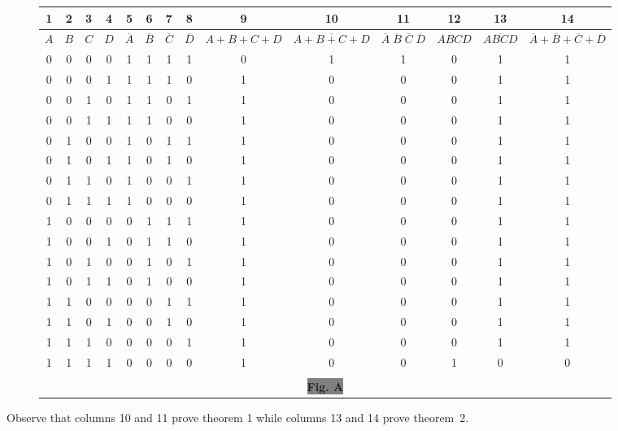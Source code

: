 \begin{solution}
\begin{figure}[H]
\begin{turn}{90}
\bigskip
\centering
\tabcolsep=6.5pt
\renewcommand{\arraystretch}{1.5}
\begin{tabular}{|c|c|c|c|c|c|c|c|c|c|c|c|c|c|}
\hline
{\bf 1} & {\bf 2} & {\bf 3} & {\bf 4} & {\bf 5} & {\bf 6} & {\bf 7} & {\bf 8} & {\bf 9} & {\bf 10} & {\bf 11} & {\bf 12} & {\bf 13} & {\bf 14}\\
\hline
$A$ & $B$ & $C$ & $D$ & $\overline{A}$ & $\overline{B}$ & $\overline{C}$ & $\overline{D}$ & $A+B+C+D$ & $\overline{A+B+C+D}$ & $\overline{A}\;\overline{B}\;\overline{C}\;\overline{D}$ & $ABCD$ & $\overline{ABCD}$ & $\overline{A}+\overline{B}+\overline{C}+\overline{D}$\\
\hline
0 & 0 & 0 & 0 & 1 & 1 & 1 & 1 & 0 & 1 & 1 & 0 & 1 & 1\\\hline
0 & 0 & 0 & 1 & 1 & 1 & 1 & 0 & 1 & 0 & 0 & 0 & 1 & 1\\\hline
0 & 0 & 1 & 0 & 1 & 1 & 0 & 1 & 1 & 0 & 0 & 0 & 1 & 1\\\hline
0 & 0 & 1 & 1 & 1 & 1 & 0 & 0 & 1 & 0 & 0 & 0 & 1 & 1\\\hline
0 & 1 & 0 & 0 & 1 & 0 & 1 & 1 & 1 & 0 & 0 & 0 & 1 & 1\\\hline
0 & 1 & 0 & 1 & 1 & 0 & 1 & 0 & 1 & 0 & 0 & 0 & 1 & 1\\\hline
0 & 1 & 1 & 0 & 1 & 0 & 0 & 1 & 1 & 0 & 0 & 0 & 1 & 1\\\hline
0 & 1 & 1 & 1 & 1 & 0 & 0 & 0 & 1 & 0 & 0 & 0 & 1 & 1\\\hline
1 & 0 & 0 & 0 & 0 & 1 & 1 & 1 & 1 & 0 & 0 & 0 & 1 & 1\\\hline
1 & 0 & 0 & 1 & 0 & 1 & 1 & 0 & 1 & 0 & 0 & 0 & 1 & 1\\\hline
1 & 0 & 1 & 0 & 0 & 1 & 0 & 1 & 1 & 0 & 0 & 0 & 1 & 1\\\hline
1 & 0 & 1 & 1 & 0 & 1 & 0 & 0 & 1 & 0 & 0 & 0 & 1 & 1\\\hline
1 & 1 & 0 & 0 & 0 & 0 & 1 & 1 & 1 & 0 & 0 & 0 & 1 & 1\\\hline
1 & 1 & 0 & 1 & 0 & 0 & 1 & 0 & 1 & 0 & 0 & 0 & 1 & 1\\\hline
1 & 1 & 1 & 0 & 0 & 0 & 0 & 1 & 1 & 0 & 0 & 0 & 1 & 1\\\hline
1 & 1 & 1 & 1 & 0 & 0 & 0 & 0 & 1 & 0 & 0 & 1 & 0 & 0\\
\hline
\multicolumn{14}{c}{}\\[-10pt]
\multicolumn{14}{c}{\colorbox{gray}{\bf\qquad Fig. A\qquad}}
\end{tabular}
\end{turn}
\end{figure}

\eject

\noindent
Observe that columns 10 and 11 prove theorem 1 while columns 13 and 14 prove theorem~2.
\end{solution}



